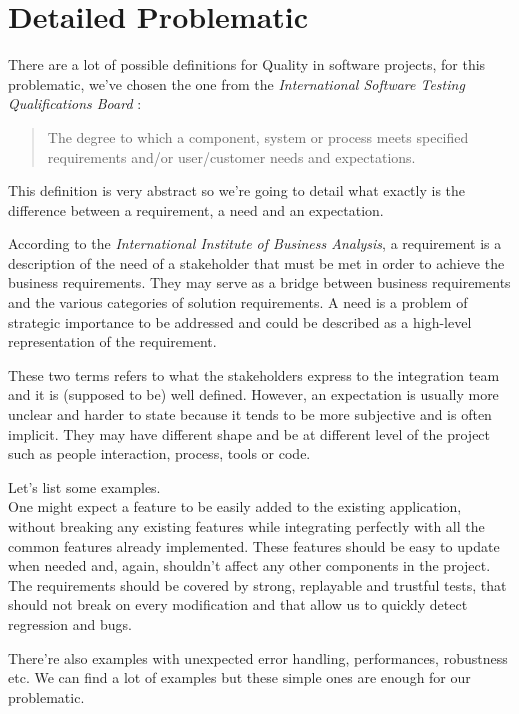 \section{Detailed Problematic}\label{sec:detailed-problematic}
There are a lot of possible definitions for Quality in software projects, for
this problematic, we've chosen the one from the \textit{International Software
Testing Qualifications Board} :
\begin{quote}
The degree to which a component, system or process meets specified
requirements and/or user/customer needs and expectations.
\end{quote}
This definition is very abstract so we're going to detail what exactly is the
difference between a requirement, a need and an expectation.

According to the \textit{International Institute of Business Analysis}, a
requirement is a description of the need of a stakeholder that must be met in
order to achieve the business requirements.
They may serve as a bridge between business requirements and the various
categories of solution requirements.
A need is a problem of strategic importance to be addressed and could be
described as a high-level representation of the requirement.

These two terms refers to what the stakeholders express to the integration
team and it is (supposed to be) well defined.
However, an expectation is usually more unclear and harder to state because
it tends to be more subjective and is often implicit.
They may have different shape and be at different level of the project such as
people interaction, process, tools or code.


Let's list some examples. \\
One might expect a feature to be easily added to the existing application,
without breaking any existing features while integrating perfectly with all the
common features already implemented.
These features should be easy to update when needed and, again, shouldn't
affect any other components in the project.
The requirements should be covered by strong, replayable and trustful tests,
that should not break on every modification and that allow us to quickly
detect regression and bugs.

There're also examples with unexpected error handling, performances,
robustness etc.
We can find a lot of examples but these simple ones are enough for our
problematic.


